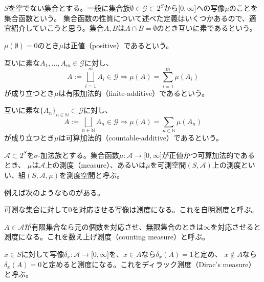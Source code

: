 \documentclass[../root.tex]{subfiles}
\begin{document}
$ S $を空でない集合とする。一般に集合族$ \emptyset\in\mathscr{G}\subset 2^{S} $から$ \lbrack 0, \infty \rbrack $への写像$ \mu $のことを集合函数という。
集合函数の性質について述べた定義はいくつかあるので、適宜紹介していこうと思う。集合$ A, B $は$ A\cap B=\emptyset $のとき互いに素であるという。
\begin{EnumCond}
\item $ \mu( \emptyset )=0 $のとき$ \mu $は正値（positive）であるという。
\item 互いに素な$ A_{1}, \dotsc, A_{m}\in\mathscr{G} $に対し、
\[ A:=\bigsqcup_{i=1}^{m}A_{i}\in\mathscr{G} \Rightarrow \mu( A )=\sum_{i=1}^{m}\mu( A_{i} ) \]
が成り立つとき$ \mu $は有限加法的（finite-additive）であるという。
\item 互いに素な$ \lbrace A_{n} \rbrace_{n\in\mathbb{N}}\subset\mathscr{G} $に対し、
\[ A:=\bigsqcup_{n\in\mathbb{N}} A_{n}\in\mathscr{G} \Rightarrow \mu( A )=\sum_{n\in\mathbb{N}}\mu( A_{n} ) \]
が成り立つとき$ \mu $は可算加法的（countable-additive）であるという。
\end{EnumCond}

\begin{Def}{}{}
$ \mathscr{A}\subset 2^{S} $を$ \sigma $-加法族とする。集合函数$ \mu\colon\mathscr{A}\rightarrow\lbrack 0, \infty \rbrack $が正値かつ可算加法的であるとき、
$ \mu $は$ \mathscr{A} $上の測度（measure）、あるいは$ \mu $を可測空間$ ( S, \mathscr{A} ) $上の測度といい、組$ ( S, \mathscr{A}, \mu ) $を測度空間と呼ぶ。
\end{Def}

例えば次のようなものがある。
\begin{EnumCond}
\item 可測な集合に対して$ 0 $を対応させる写像は測度になる。これを自明測度と呼ぶ。
\item $ A\in\mathscr{A} $が有限集合なら元の個数を対応させ、無限集合のときは$ \infty $を対応させると測度になる。これを数え上げ測度（counting measure）と呼ぶ。
\item $ x\in S $に対して写像$ \delta_{x}\colon\mathscr{A}\rightarrow\lbrack 0, \infty \rbrack $を、$ x\in A $なら$ \delta_{x}( A )=1 $と定め、
$ x\notin A $なら$ \delta_{x}( A )=0 $と定めると測度になる。これをディラック測度（Dirac's measure）と呼ぶ。
\end{EnumCond}
\end{document}
